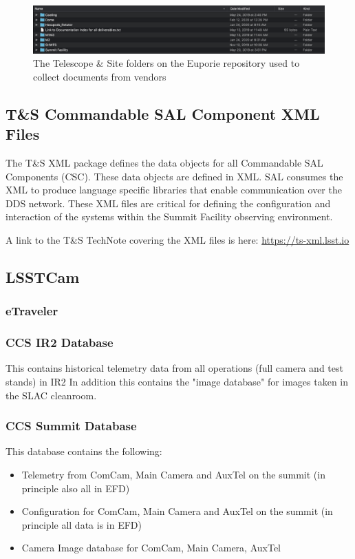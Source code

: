 \begin{figure}
\begin{center}
  \includegraphics[scale=0.33]{Figures/EuporieTS.png}
\end{center}
\caption{\label{fig:EuporyTS} The Telescope \& Site folders on the Euporie repository used to collect documents from vendors}
\end{figure}

\subsection{T\&S Commandable SAL Component XML Files}

The T\&S XML package defines the data objects for all Commandable SAL Components (CSC). These data objects are defined in XML. SAL consumes the XML to produce language specific libraries that enable communication over the DDS network.  These XML files are critical for defining the configuration and interaction of the systems within the Summit Facility observing environment.

A link to the T\&S TechNote covering the XML files is here: \url{https://ts-xml.lsst.io}

\subsection{LSSTCam}
	\subsubsection{eTraveler}
	\subsubsection{CCS IR2 Database}
	This contains historical telemetry data from all operations (full camera and test stands) in IR2 In addition this contains the "image database" for images taken in the SLAC cleanroom.
	\subsubsection{CCS Summit Database}
	This database contains the following:
	\begin{itemize}
		\item Telemetry from ComCam, Main Camera and AuxTel on the summit (in principle also all in EFD)
		\item Configuration for ComCam, Main Camera and AuxTel on the summit (in principle all data is in EFD)
		\item Camera Image database for ComCam, Main Camera, AuxTel
	\end{itemize}

